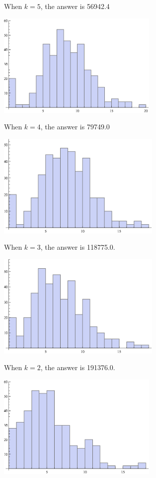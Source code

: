 \documentclass[a4paper, 12pt]{mcshw}
\begin{document}
\begin{enumerate}
\begin{solution}
\begin{center}
        \end{center}
        When $k = 5$, the answer is 56942.4
        \begin{center}
            \includegraphics[height=5cm]{1_gr4.eps}
        \end{center}
        When $k = 4$, the answer is 79749.0
        \begin{center}
            \includegraphics[height=5cm]{1_gr5.eps}
        \end{center}
        When $k = 3$, the answer is 118775.0.
        \begin{center}
            \includegraphics[height=5cm]{1_gr6.eps}
        \end{center}
        When $k = 2$, the answer is 191376.0.
        \begin{center}
            \includegraphics[height=5cm]{1_gr7.eps}

\end{center}
\end{solution}
\end{enumerate}
\end{document}
